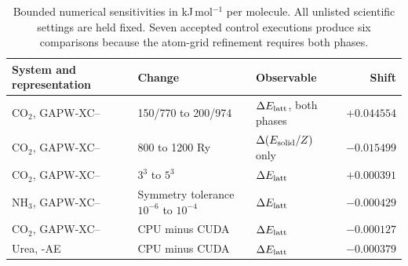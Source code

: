 \begin{table}[t]
\centering
\caption{Bounded numerical sensitivities in kJ\,mol$^{-1}$ per molecule. All unlisted scientific settings are held fixed. Seven accepted control executions produce six comparisons because the atom-grid refinement requires both phases.}
\label{tab:x23_controls_si}
\begin{tabular}{@{}p{}p{}p{}r@{}}
\toprule
System and representation & Change & Observable & Shift \\
\midrule
CO$_2$, GAPW-XC--\GTH{} & 150/770 to 200/974 & $\Delta E_{\rm latt}$, both phases & $+0.044554$ \\
CO$_2$, GAPW-XC--\GTH{} & 800 to 1200 Ry & $\Delta(E_{\rm solid}/Z)$ only & $-0.015499$ \\
CO$_2$, GAPW-XC--\GTH{} & $3^3$ to $5^3$ & $\Delta E_{\rm latt}$ & $+0.000391$ \\
NH$_3$, GAPW-XC--\GTH{} & Symmetry tolerance $10^{-6}$ to $10^{-4}$ & $\Delta E_{\rm latt}$ & $-0.000429$ \\
CO$_2$, GAPW-XC--\GTH{} & CPU minus CUDA & $\Delta E_{\rm latt}$ & $-0.000127$ \\
Urea, \GAPW{}-AE & CPU minus CUDA & $\Delta E_{\rm latt}$ & $-0.000379$ \\
\bottomrule
\end{tabular}
\end{table}
